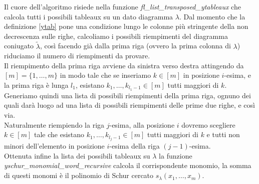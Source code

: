 Il cuore dell'algoritmo risiede nella funzione
\emph{fl\_list\_transposed\_ytableaux} che calcola tutti i
possibili tableaux su un dato diagramma $\lambda$. Dal momento che la
definizione \ref{ytab} pone una condizione
lungo le colonne pi\`u stringente della non decrescenza sulle
righe, calcoliamo i possibili riempimenti del diagramma coniugato
$\tilde{\lambda}$, cos\`i facendo gi\`a dalla prima riga (ovvero la
prima colonna di $\lambda$) riduciamo il numero di riempimenti da
provare.\\
Il riempimento della prima riga avviene da sinistra verso destra
attingendo da $[m]=\{1,\ldots, m\}$ in modo tale che se inseriamo $k \in
[m]$ in posizione $i$-esima, e la prima riga \`e lunga $l_1$, esistano
$k_1,\ldots,k_{l_1-1} \in [m]$ tutti maggiori di $k$. Generiamo quindi
una lista di possibili riempimenti della prima riga, ognuno dei quali
dar\`a luogo ad una lista di possibili riempimenti delle prime due
righe, e cos\`i via.\\ 
Naturalmente riempiendo la riga $j$-esima, alla
posizione $i$ dovremo scegliere $k \in [m]$ tale che esistano
$k_1,\ldots,k_{l_j-1} \in [m]$ tutti maggiori di $k$ e tutti non
minori dell'elemento in posizione $i$-esima della riga
$(j-1)$-esima.\\
Ottenuta infine la lista dei possibili tableaux su $\lambda$ la
funzione \emph{yschur\_monomial\_word\_recursive} calcola il
corrispondente monomio, la somma di questi monomi \`e il polinomio di
Schur cercato $s_\lambda(x_1,\ldots,x_m)$.


